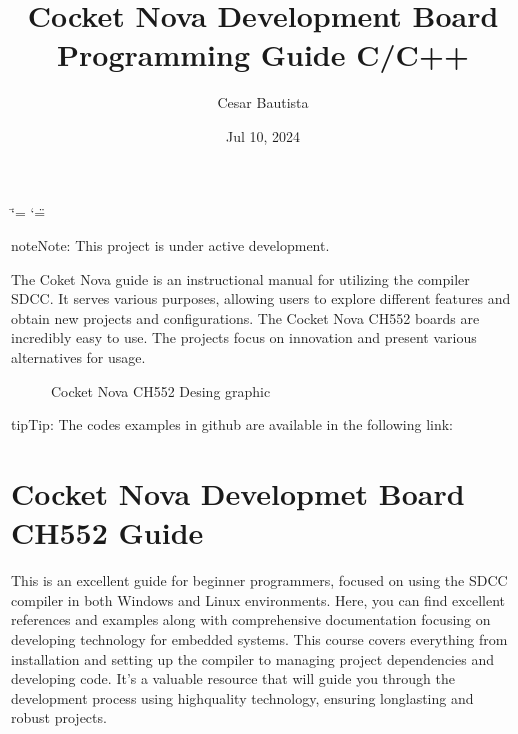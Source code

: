 \documentclass[letterpaper,10pt,english]{sphinxmanual}
\title{Cocket Nova Development Board Programming Guide C/C++}
\date{Jul 10, 2024}
\author{Cesar Bautista}
\begin{document}
\ifdefined\shorthandoff
  \ifnum\catcode`\=\string=\active\shorthandoff{=}\fi
  \ifnum\catcode`\"=\active{}\fi
\fi

\pagestyle{empty}
\sphinxmaketitle
\pagestyle{plain}
\sphinxtableofcontents
\pagestyle{normal}
\label{\detokenize{index::doc}}


\begin{sphinxadmonition}{note}{Note:}
\sphinxAtStartPar
This project is under active development.
\end{sphinxadmonition}

\sphinxAtStartPar
The Coket Nova guide is an instructional manual for utilizing the compiler SDCC. It serves various purposes, allowing users to explore different features and obtain new projects and
configurations.
The Cocket Nova CH552 boards are incredibly easy to use. The projects focus on innovation and
present various alternatives for usage.

\begin{figure}[htbp]
\centering
\capstart

\noindent{}
\caption{Cocket Nova CH552 Desing graphic}\label{\detokenize{index:id1}}\label{\detokenize{index:ch552}}\end{figure}

\begin{sphinxadmonition}{tip}{Tip:}
\sphinxAtStartPar
The codes examples in github are available in the following link: 
\end{sphinxadmonition}

\sphinxstepscope


\chapter{Cocket Nova Developmet Board CH552 Guide}
\label{\detokenize{about:cocket-nova-developmet-board-ch552-guide}}\label{\detokenize{about::doc}}
\sphinxAtStartPar
This is an excellent guide for beginner programmers, focused on using the SDCC compiler in both Windows and Linux environments.
Here, you can find excellent references and examples along with comprehensive documentation focusing on developing technology for embedded systems.
This course covers everything from installation and setting up the compiler to managing project dependencies and developing code.
It’s a valuable resource that will guide you through the development process using high\sphinxhyphen{}quality technology, ensuring long\sphinxhyphen{}lasting and robust projects.
\end{document}

